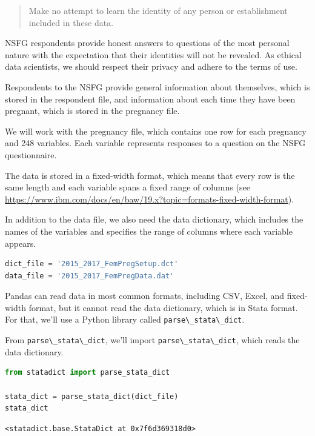 \begin{quote}
Make no attempt to learn the identity of any person or establishment
included in these data.
\end{quote}

NSFG respondents provide honest answers to questions of the most
personal nature with the expectation that their identities will not be
revealed. As ethical data scientists, we should respect their privacy
and adhere to the terms of use.

Respondents to the NSFG provide general information about themselves,
which is stored in the respondent file, and information about each time
they have been pregnant, which is stored in the pregnancy file.

We will work with the pregnancy file, which contains one row for each
pregnancy and 248 variables. Each variable represents responses to a
question on the NSFG questionnaire.

The data is stored in a fixed-width format, which means that every row
is the same length and each variable spans a fixed range of columns (see
\url{https://www.ibm.com/docs/en/baw/19.x?topic=formats-fixed-width-format}).

In addition to the data file, we also need the data dictionary, which
includes the names of the variables and specifies the range of columns
where each variable appears.

\begin{lstlisting}[language=Python]
dict_file = '2015_2017_FemPregSetup.dct'
data_file = '2015_2017_FemPregData.dat'
\end{lstlisting}

Pandas can read data in most common formats, including CSV, Excel, and
fixed-width format, but it cannot read the data dictionary, which is in
Stata format. For that, we'll use a Python library called
\passthrough{\lstinline!parse\_stata\_dict!}.

From \passthrough{\lstinline!parse\_stata\_dict!}, we'll import
\passthrough{\lstinline!parse\_stata\_dict!}, which reads the data
dictionary.

\begin{lstlisting}[language=Python]
from statadict import parse_stata_dict

stata_dict = parse_stata_dict(dict_file)
stata_dict
\end{lstlisting}

\begin{lstlisting}[]
<statadict.base.StataDict at 0x7f6d369318d0>
\end{lstlisting}

